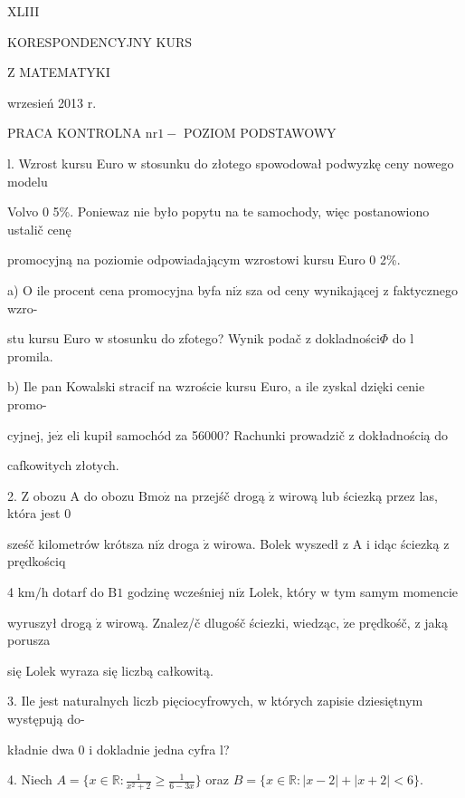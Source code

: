 \documentclass[a4paper,12pt]{article}
\begin{document}
XLIII

KORESPONDENCYJNY KURS

Z MATEMATYKI

wrzesień 2013 r.

PRACA KONTROLNA $\mathrm{n}\mathrm{r} 1 -$ POZIOM PODSTAWOWY

l. Wzrost kursu Euro $\mathrm{w}$ stosunku do złotego spowodował podwyzkę ceny nowego modelu

Volvo $0$ 5\%. Poniewaz nie było popytu na te samochody, więc postanowiono ustalič cenę

promocyjną na poziomie odpowiadającym wzrostowi kursu Euro $0$ 2\%.

a) $\mathrm{O}$ ile procent cena promocyjna byfa $\mathrm{n}\mathrm{i}\dot{\mathrm{z}}$ sza od ceny wynikającej $\mathrm{z}$ faktycznego wzro-

stu kursu Euro $\mathrm{w}$ stosunku do zfotego? Wynik podač $\mathrm{z}$ dokladności$\Phi$ do l promila.

b) Ile pan Kowalski stracif na wzroście kursu Euro, a ile zyskal dzięki cenie promo-

cyjnej, $\mathrm{j}\mathrm{e}\dot{\mathrm{z}}$ eli kupił samochód za 56000? Rachunki prowadzič $\mathrm{z}$ dokładnością do

cafkowitych złotych.

2. $\mathrm{Z}$ obozu A do obozu $\mathrm{B}\mathrm{m}\mathrm{o}\dot{\mathrm{z}}$ na przejśč drogą $\dot{\mathrm{z}}$ wirową lub ściezką przez las, która jest $0$

sześč kilometrów krótsza $\mathrm{n}\mathrm{i}\dot{\mathrm{z}}$ droga $\dot{\mathrm{z}}$ wirowa. Bolek wyszedł $\mathrm{z}$ A $\mathrm{i}$ idąc ściezką $\mathrm{z}$ prędkościq

4 $\mathrm{k}\mathrm{m}/\mathrm{h}$ dotarf do $\mathrm{B} 1$ godzinę wcześniej $\mathrm{n}\mathrm{i}\dot{\mathrm{z}}$ Lolek, który $\mathrm{w}$ tym samym momencie

wyruszył drogą $\dot{\mathrm{z}}$ wirową. Znalez/č dlugośč ściezki, wiedząc, $\dot{\mathrm{z}}\mathrm{e}$ prędkośč, $\mathrm{z}$ jaką porusza

się Lolek wyraza się liczbą całkowitą.

3. Ile jest naturalnych liczb pięciocyfrowych, $\mathrm{w}$ których zapisie dziesiętnym występują do-

kładnie dwa 0 $\mathrm{i}$ dokladnie jedna cyfra l?

4. Niech $A=\displaystyle \{x\in \mathbb{R}:\frac{1}{x^{2}+2}\geq\frac{1}{6-3x}\}$ oraz $B=\{x\in \mathbb{R}:|x-2|+|x+2|<6\}.$
\end{document}
